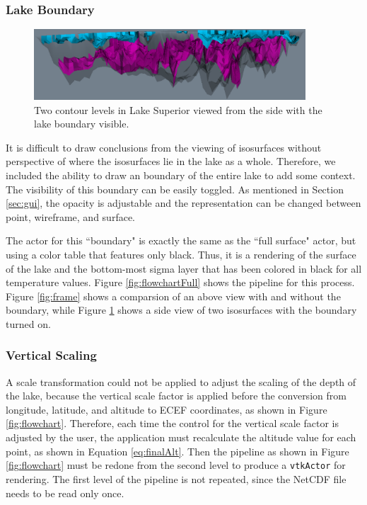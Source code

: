\documentclass{article} %
\newcommand{\code}[1]{\texttt{#1}}
\begin{document}
\subsubsection{Lake Boundary}\label{sec:lakeBoundary}

\begin{figure}[htb]
   \centering
   \includegraphics[width=4in]{figures/lakeside.eps}
   \caption{Two contour levels in Lake Superior viewed from the side with the lake boundary visible.}
   \label{fig:lakeside}
\end{figure}

It is difficult to draw conclusions from the viewing of isosurfaces without perspective of where the isosurfaces lie in the lake as a whole.  Therefore, we included the ability to draw an boundary of the entire lake to add some context.  The visibility of this boundary can be easily toggled.  As mentioned in Section \ref{sec:gui}, the opacity is adjustable and the representation can be changed between point, wireframe, and surface.

The actor for this ``boundary" is exactly the same as the ``full surface" actor, but using a color table that features only black.  Thus, it is a rendering of the surface of the lake and the bottom-most sigma layer that has been colored in black for all temperature values.  Figure \ref{fig:flowchartFull} shows the pipeline for this process.   Figure \ref{fig:frame} shows a comparsion of an above view with and without the boundary, while Figure \ref{fig:lakeside} shows a side view of two isosurfaces with the boundary turned on.

\subsubsection{Vertical Scaling}

A scale transformation could not be applied to adjust the scaling of the depth of the lake, because the vertical scale factor is applied before the conversion from longitude, latitude, and altitude to ECEF coordinates, as shown in Figure \ref{fig:flowchart}.  Therefore, each time the control for the vertical scale factor is adjusted by the user, the application must recalculate the altitude value for each point, as shown in Equation \ref{eq:finalAlt}.  Then the pipeline as shown in Figure \ref{fig:flowchart} must be redone from the second level to produce a \code{vtkActor} for rendering.  The first level of the pipeline is not repeated, since the NetCDF file needs to be read only once.
\end{document}
